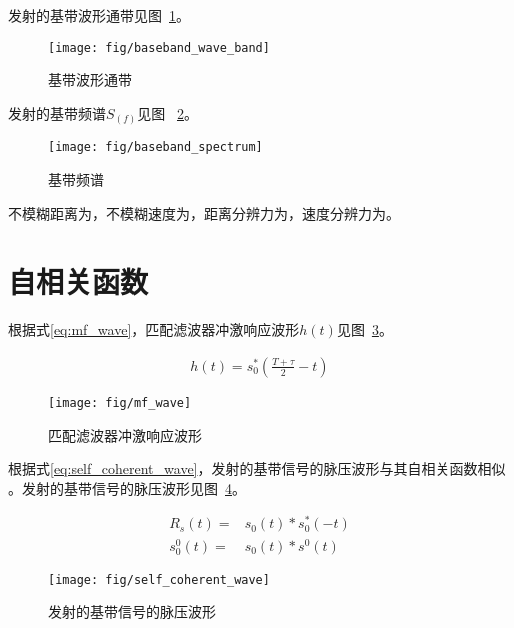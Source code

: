 \documentclass[../main]{subfiles}
\begin{document}
发射的基带波形通带见图~\ref{fig:baseband_wave_band}。

\begin{figure}[htbp]
  \centering
  \texttt{[image: fig/baseband\_wave\_band]}
  \caption{基带波形通带}%
  \label{fig:baseband_wave_band}
\end{figure}

发射的基带频谱$S_(f)$见图%
~\ref{fig:baseband_spectrum}。

\begin{figure}[htbp]
  \centering
  \texttt{[image: fig/baseband\_spectrum]}
  \caption{基带频谱}%
  \label{fig:baseband_spectrum}
\end{figure}

\begin{Answer}[ref = ex:1]
  不模糊距离为，不模糊速度为，距离分辨力为，速度分辨力为。
\end{Answer}

\section{自相关函数}%
\label{sec:self_coherent}

根据式\ref{eq:mf_wave}，匹配滤波器冲激响应波形$h(t)$见图~\ref{fig:mf_wave}。

\begin{align}
  \label{eq:mf_wave}
  h(t) = s_0^*(\frac{T + \tau}{2} - t)
\end{align}

\begin{figure}[htbp]
  \centering
  \texttt{[image: fig/mf\_wave]}
  \caption{匹配滤波器冲激响应波形}%
  \label{fig:mf_wave}
\end{figure}

根据式\ref{eq:self_coherent_wave}，发射的基带信号的脉压波形与其自相关函数相似
。发射的基带信号的脉压波形见图~\ref{fig:self_coherent_wave}。

\begin{align}
  \label{eq:self_coherent_wave}
  R_s(t) = & s_0(t) * s_0^*(-t)\\
  s_0^0(t) = & s_0(t) * s^0(t)
\end{align}

\begin{figure}[htbp]
  \centering
  \texttt{[image: fig/self\_coherent\_wave]}
  \caption{发射的基带信号的脉压波形}%
  \label{fig:self_coherent_wave}
\end{figure}
\end{document}
